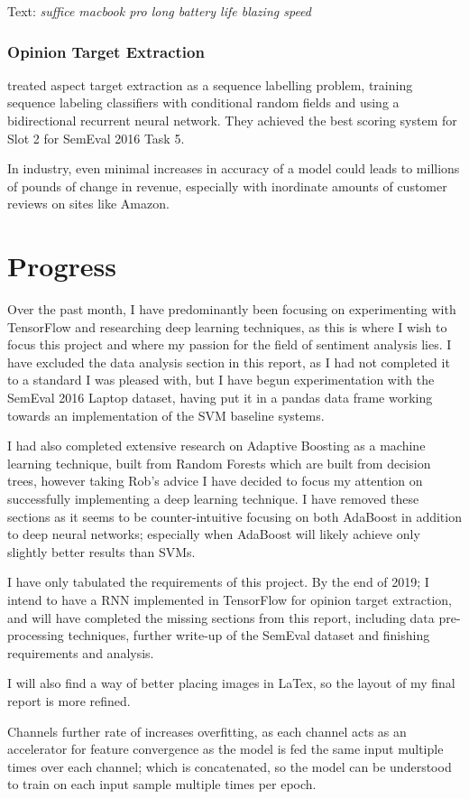 \begin{center}
    Text: \textit{suffice macbook pro long battery life blazing speed}
\end{center}




\subsubsection{Opinion Target Extraction}
\textcolor{cite}{\citet{tohsu}} treated aspect target extraction as a sequence labelling problem, training sequence labeling classifiers with conditional random fields and using a bidirectional recurrent neural network. They achieved the best scoring system for Slot 2 for SemEval 2016 Task 5.  


In industry, even minimal increases in accuracy of a model could leads to millions of pounds of change in revenue, especially with inordinate amounts of customer reviews on sites like Amazon. 




\section{Progress}

Over the past month, I have predominantly been focusing on experimenting with TensorFlow and researching deep learning techniques, as this is where I wish to focus this project and where my passion for the field of sentiment analysis lies. 
I have excluded the data analysis section in this report, as I had not completed it to a standard I was pleased with, but I have begun experimentation with the SemEval 2016 Laptop dataset, having put it in a pandas data frame working towards an implementation of the SVM baseline systems. 

I had also completed extensive research on Adaptive Boosting as a machine learning technique, built from Random Forests which are built from decision trees, however taking Rob's advice I have decided to focus my attention on successfully implementing a deep learning technique. I have removed these sections as it seems to be counter-intuitive focusing on both AdaBoost in addition to deep neural networks; especially when AdaBoost will likely achieve only slightly better results than SVMs.

I have only tabulated the requirements of this project.
By the end of 2019; I intend to have a RNN implemented in TensorFlow for opinion target extraction, and will have completed the missing sections from this report, including data pre-processing techniques, further write-up of the SemEval dataset and finishing requirements and analysis.   

I will also find a way of better placing images in LaTex, so the layout of my final report is more refined. 
\newpage


Channels further rate of increases overfitting, as each channel acts as an accelerator for feature convergence as the model is fed the same input multiple times over each channel; which is concatenated, so the model can be understood to train on each input sample multiple times per epoch. 
